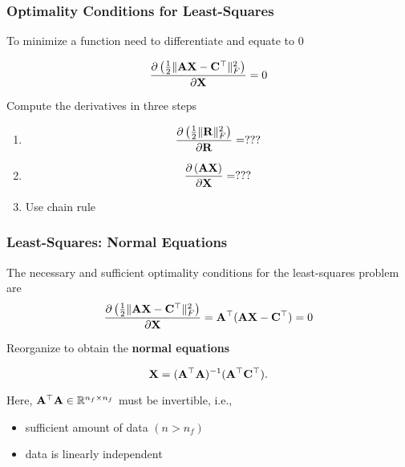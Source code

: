 \documentclass[12pt,fleqn,handout]{beamer}
\begin{document}
\begin{frame}\frametitle{Optimality Conditions for Least-Squares}

To minimize a function need to differentiate and equate to $0$

$$ {\frac {\partial \left( {\frac 12} \|{\bf A}{\bf X} - {\bf C}^\top\|^2_F \right)}{\partial {\bf X}}} = 0 $$

Compute the derivatives in three steps


\begin{enumerate}
\item $$ {\frac {\partial \left( {\frac 12} \|{\bf R} \|^2_F \right)}{\partial {\bf R}}} = ??? $$

\item $$ {\frac {\partial \left( {\bf A} {\bf X} \right)}{\partial {\bf X}}} = ??? $$

\item Use chain rule

\end{enumerate}


\end{frame} \begin{frame}\frametitle{Least-Squares: Normal Equations}

The necessary and sufficient optimality conditions for the least-squares problem are
$$ {\frac {\partial \left( {\frac 12} \|{\bf A}{\bf X} - {\bf C}^\top\|^2_F \right)}{\partial {\bf X}}} = 
{\bf A}^\top({\bf A} {\bf X} - {\bf C}^\top)=0 $$

Reorganize to obtain the {\bf normal equations}

$$ {\bf X} =  ({\bf A}^\top {\bf A})^{-1}({\bf A}^\top {\bf C}^\top). $$

Here, ${\bf A}^\top {\bf A} \in \mathbb{R}^{n_f \times n_f}$ must be invertible, i.e., 
\begin{itemize}
\item sufficient amount of data $(n>n_f)$
\item data is linearly independent
\end{itemize}

\end{frame}
\end{document}
